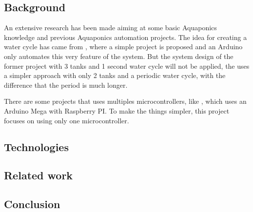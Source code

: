 \subsection{Background}
An extensive research has been made aiming at some basic Aquaponics knowledge and previous Aquaponics automation projects.
The idea for creating a water cycle has came from \cite{simpleArduinoAquaponics},
where a simple project is proposed and an Arduino only automates this very feature of the system.
But the system design of the former project with 3 tanks and 1 second water cycle will not be applied,
the \cite{Kretzinger2015} uses a simpler approach with only 2 tanks and a periodic water cycle,
with the difference that the period is much longer.

There are some projects that uses multiples microcontrollers,
like \cite{GarethColeman2014},
which uses an Arduino Mega with Raspberry PI.
To make the things simpler,
this project focuses on using only one microcontroller.

\subsection{Technologies}
\subsection{Related work}
\subsection{Conclusion}
